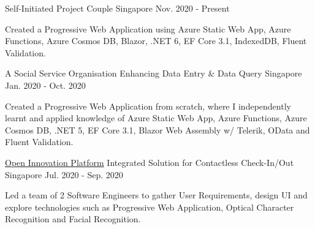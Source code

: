 

\begin{cventries}

  \cventry
    {Self-Initiated Project} %
    {Couple} %
    {Singapore} %
    {Nov. 2020 - Present} %
    {
      \begin{cvitems} %
        \item {Created a Progressive Web Application using Azure Static Web App, Azure Functions, Azure Cosmos DB, Blazor, .NET 6, EF Core 3.1, IndexedDB, Fluent Validation.}
      \end{cvitems}
    }

  \cventry
    {A Social Service Organisation} %
    {Enhancing Data Entry \& Data Query} %
    {Singapore} %
    {Jan. 2020 - Oct. 2020} %
    {
      \begin{cvitems} %
        \item {Created a Progressive Web Application from scratch, where I independently learnt and applied knowledge of Azure Static Web App,  Azure Functions, Azure Cosmos DB, .NET 5, EF Core 3.1, Blazor Web Assembly w/ Telerik, OData and Fluent Validation.}
      \end{cvitems}
    }

  \cventry
    {\href{https://www.openinnovation.sg/about}{Open Innovation Platform}} %
    {Integrated Solution for Contactless Check-In/Out} %
    {Singapore} %
    {Jul. 2020 - Sep. 2020} %
    {
      \begin{cvitems} %
        \item {Led a team of 2 Software Engineers to gather User Requirements, design UI and explore technologies such as Progressive Web Application, Optical Character Recognition and Facial Recognition.}
      \end{cvitems}
    }


\end{cventries}
